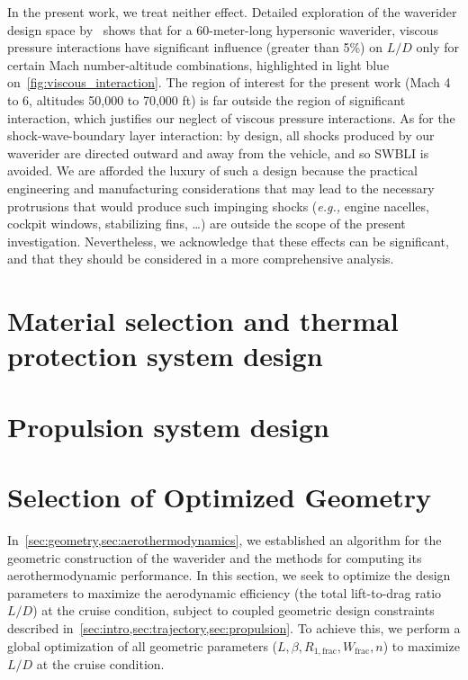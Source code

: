 \documentclass[10pt,a4paper]{article}
\begin{document}
In the present work, we treat neither effect. Detailed exploration of the waverider design space by~\cite{Anderson:1992} shows that for a 60-meter-long hypersonic waverider, viscous pressure interactions have significant influence (greater than 5\%) on $L/D$ only for certain Mach number-altitude combinations, highlighted in light blue on~\cref{fig:viscous_interaction}. The region of interest for the present work (Mach 4 to 6, altitudes 50,000 to 70,000 ft) is far outside the region of significant interaction, which justifies our neglect of viscous pressure interactions. As for the shock-wave-boundary layer interaction: by design, all shocks produced by our waverider are directed outward and away from the vehicle, and so SWBLI is avoided. We are afforded the luxury of such a design because the practical engineering and manufacturing considerations that may lead to the necessary protrusions that would produce such impinging shocks (\textit{e.g.,} engine nacelles, cockpit windows, stabilizing fins, \ldots) are outside the scope of the present investigation. Nevertheless, we acknowledge that these effects can be significant, and that they should be considered in a more comprehensive analysis.

\section{Material selection and thermal protection system design}\label{sec:TPS}


\section{Propulsion system design}\label{sec:propulsion}


\FloatBarrier%
\section{Selection of Optimized Geometry}\label{sec:optimization}
In~\cref{sec:geometry,sec:aerothermodynamics}, we established an algorithm for the geometric construction of the waverider and the methods for computing its aerothermodynamic performance. In this section, we seek to optimize the design parameters to maximize the aerodynamic efficiency (the total lift-to-drag ratio $L/D$) at the cruise condition, subject to coupled geometric design constraints described in~\cref{sec:intro,sec:trajectory,sec:propulsion}. To achieve this, we perform a global optimization of all geometric parameters ($L,\beta,R_{1,\text{frac}},W_{\text{frac}},n$) to maximize $L/D$ at the cruise condition.
\end{document}
